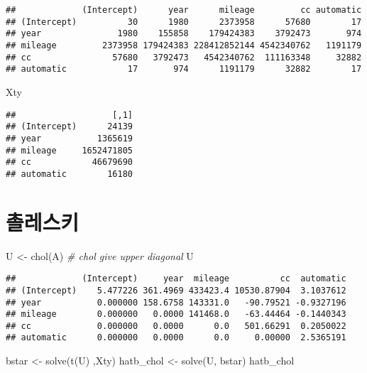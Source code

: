 \documentclass[
]{book}
\newenvironment{Shaded}{\begin{snugshade}}{\end{snugshade}}
\newcommand{\CommentTok}[1]{\textcolor[rgb]{0.56,0.35,0.01}{\textit{#1}}}
\newcommand{\FunctionTok}[1]{\textcolor[rgb]{0.00,0.00,0.00}{#1}}
\newcommand{\NormalTok}[1]{#1}
\newcommand{\OtherTok}[1]{\textcolor[rgb]{0.56,0.35,0.01}{#1}}
\begin{document}
\begin{verbatim}
##             (Intercept)      year      mileage         cc automatic
## (Intercept)          30      1980      2373958      57680        17
## year               1980    155858    179424383    3792473       974
## mileage         2373958 179424383 228412852144 4542340762   1191179
## cc                57680   3792473   4542340762  111163348     32882
## automatic            17       974      1191179      32882        17
\end{verbatim}

\begin{Shaded}
\begin{Highlighting}[]
\NormalTok{Xty}
\end{Highlighting}
\end{Shaded}

\begin{verbatim}
##                   [,1]
## (Intercept)      24139
## year           1365619
## mileage     1652471805
## cc            46679690
## automatic        16180
\end{verbatim}

\hypertarget{uxcd10uxb808uxc2a4uxd0a4}{%
\section{촐레스키}\label{uxcd10uxb808uxc2a4uxd0a4}}

\begin{Shaded}
\begin{Highlighting}[]
\NormalTok{U }\OtherTok{\textless{}{-}} \FunctionTok{chol}\NormalTok{(A) }\CommentTok{\# chol give upper diagonal}
\NormalTok{U}
\end{Highlighting}
\end{Shaded}

\begin{verbatim}
##             (Intercept)     year  mileage          cc  automatic
## (Intercept)    5.477226 361.4969 433423.4 10530.87904  3.1037612
## year           0.000000 158.6758 143331.0   -90.79521 -0.9327196
## mileage        0.000000   0.0000 141468.0   -63.44464 -0.1440343
## cc             0.000000   0.0000      0.0   501.66291  0.2050022
## automatic      0.000000   0.0000      0.0     0.00000  2.5365191
\end{verbatim}

\begin{Shaded}
\begin{Highlighting}[]
\NormalTok{bstar }\OtherTok{\textless{}{-}} \FunctionTok{solve}\NormalTok{(}\FunctionTok{t}\NormalTok{(U) ,Xty)}
\NormalTok{hatb\_chol }\OtherTok{\textless{}{-}} \FunctionTok{solve}\NormalTok{(U, bstar)}
\NormalTok{hatb\_chol}
\end{Highlighting}
\end{Shaded}
\end{document}
